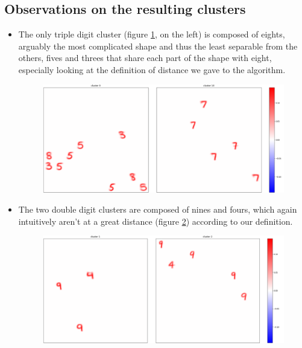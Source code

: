 \documentclass[a4paper]{report}
\begin{document}
\subsection{Observations on the resulting clusters}

\begin{itemize}
    \item The only triple digit cluster (figure \ref{910}, on the left) is composed of eights, arguably the most complicated shape and thus the least separable from the others, fives and threes that share each part of the shape with eight, especially looking at the definition of distance we gave to the algorithm.

\begin{figure} [H]
    \centering
    \includegraphics [width=\textwidth ] {c/h/9.png}
    \caption{}
    \label{910}
\end{figure}

    \item The two double digit clusters are composed of nines and fours, which again intuitively aren't at a great distance (figure \ref{12}) according to our definition.

\begin{figure} [H]
    \centering
    \includegraphics [width=\textwidth ] {c/h/1.png}
    \caption{}
    \label{12}
\end{figure}


\end{itemize}
\end{document}
